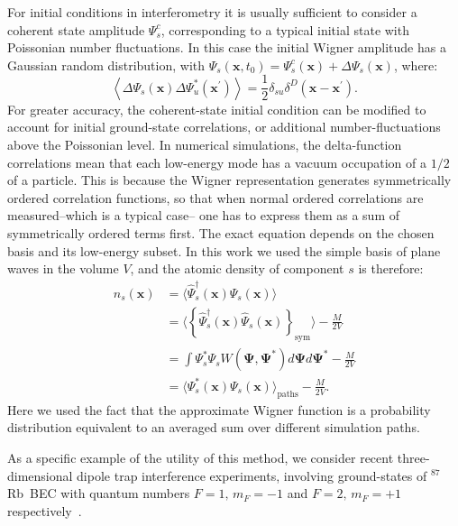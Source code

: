 \documentclass[aps,prl,twocolumn,showpacs,amsmath,amssymb,superscriptaddress]{revtex4-1}
\newcommand{\Rb}{$^{87}$Rb}
\newcommand{\xvec}{\boldsymbol{x}}
\newcommand{\Psivec}{\boldsymbol{\Psi}}
\begin{document}
For initial conditions in interferometry it is usually sufficient
to consider a coherent state amplitude $\Psi_{s}^{c}$,
corresponding to a typical initial state with Poissonian number fluctuations.
In this case the initial Wigner amplitude has a Gaussian random distribution,
with $\Psi_{s}(\xvec,t_{0})=\Psi_{s}^{c}(\xvec)+\Delta\Psi_{s}(\xvec)$,
where:
\begin{equation}
	\left\langle
		\Delta\Psi_{s}(\xvec) \Delta\Psi_{u}^{*}(\xvec^\prime)
	\right\rangle =
	\frac{1}{2} \delta_{su} \delta^{D} \left( \xvec - \xvec^\prime\right).
\end{equation}
For greater accuracy, the coherent-state initial condition
can be modified to account for initial ground-state correlations,
or additional number-fluctuations above the Poissonian level.
In numerical simulations, the delta-function correlations mean that
each low-energy mode has a vacuum occupation of a $1/2$ of a particle.
This is because the Wigner representation generates symmetrically ordered correlation functions,
so that when normal ordered correlations are measured\---which is a typical case\---
one has to express them as a sum of symmetrically ordered terms first.
The exact equation depends on the chosen basis and its low-energy subset.
In this work we used the simple basis of plane waves in the volume $V$,
and the atomic density of component $s$ is therefore:
\begin{equation}
\begin{split}
n_{s} (\xvec) & =
\langle \widehat{\Psi}^\dagger_{s} (\xvec) \widehat{\Psi}_{s} (\xvec) \rangle \\
& = \langle \left\{ \widehat{\Psi}^\dagger_{s} (\xvec)
	\widehat{\Psi}_{s} (\xvec) \right\}_{\mathrm{sym}} \rangle - \frac{M}{2V} \\
& = \int \Psi^*_{s} \Psi_{s} W(\Psivec, \Psivec^*) d\Psivec d\Psivec^* - \frac{M}{2V} \\
& = \langle \Psi^*_{s} (\xvec) \Psi_{s} (\xvec) \rangle_{\mathrm{paths}} - \frac{M}{2V}.
\end{split}
\end{equation}
Here we used the fact that the approximate Wigner function is a probability distribution
equivalent to an averaged sum over different simulation paths.

As a specific example of the utility of this method,
we consider recent three-dimensional dipole trap interference experiments,
involving ground-states of \Rb~BEC with quantum numbers ${F=1,\, m_{F}=-1}$
and ${F=2,\, m_{F}=+1}$ respectively~\cite{Egorov2010}.
\end{document}
